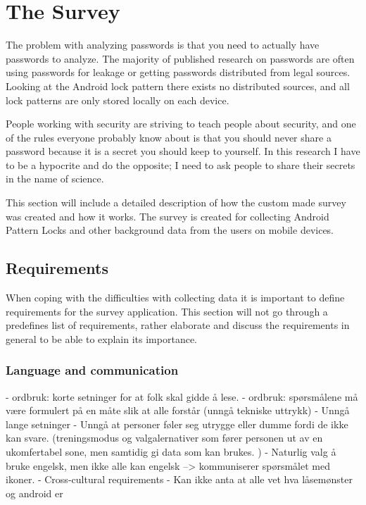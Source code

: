 \section{The Survey}\label{sec:survey}
  
  The problem with analyzing passwords is that you need to actually have passwords to analyze. The majority of published research on passwords are often using passwords for leakage or getting passwords distributed from legal sources. Looking at the Android lock pattern there exists no distributed sources, and all lock patterns are only stored locally on each device. 

  People working with security are striving to teach people about security, and one of the rules everyone probably know about is that you should never share a password because it is a secret you should keep to yourself. In this research I have to be a hypocrite and do the opposite; I need to ask people to share their secrets in the name of science. 

  This section will include a detailed description of how the custom made survey was created and how it works. The survey is created for collecting Android Pattern Locks and other background data from the users on mobile devices. 

  \subsection{Requirements}

    When coping with the difficulties with collecting data it is important to define requirements for the survey application. This section will not go through a predefines list of requirements, rather elaborate and discuss the requirements in general to be able to explain its importance.

    \subsubsection*{Language and communication}
      - ordbruk: korte setninger for at folk skal gidde å lese.
      - ordbruk: spørsmålene må være formulert på en måte slik at alle forstår (unngå tekniske uttrykk)
      - Unngå lange setninger
      - Unngå at personer føler seg utrygge eller dumme fordi de ikke kan svare.  (treningsmodus og valgalernativer som fører personen ut av en ukomfertabel sone, men samtidig gi data som kan brukes. )
      - Naturlig valg å bruke engelsk, men ikke alle kan engelsk --> kommuniserer spørsmålet med ikoner. 
      - Cross-cultural requirements
      - Kan ikke anta at alle vet hva låsemønster og android er

